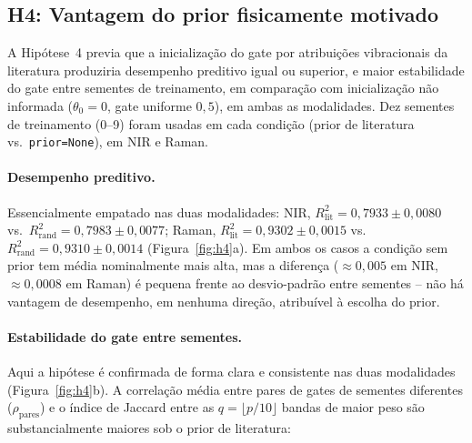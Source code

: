 %
%

\subsection{H4: Vantagem do prior fisicamente motivado}
\label{sec:results-h4}

A Hipótese~4 previa que a inicialização do gate por atribuições vibracionais da literatura produziria desempenho preditivo igual ou superior, e maior estabilidade do gate entre sementes de treinamento, em comparação com inicialização não informada ($\theta_0 = 0$, gate uniforme $0{,}5$), em ambas as modalidades. Dez sementes de treinamento (0--9) foram usadas em cada condição (prior de literatura vs.\ \texttt{prior=None}), em NIR e Raman.

\paragraph{Desempenho preditivo.} Essencialmente empatado nas duas modalidades: NIR, $R^2_{\text{lit}}=0{,}7933\pm0{,}0080$ vs.\ $R^2_{\text{rand}}=0{,}7983\pm0{,}0077$; Raman, $R^2_{\text{lit}}=0{,}9302\pm0{,}0015$ vs.\ $R^2_{\text{rand}}=0{,}9310\pm0{,}0014$ (Figura~\ref{fig:h4}a). Em ambos os casos a condição sem prior tem média nominalmente mais alta, mas a diferença ($\approx 0{,}005$ em NIR, $\approx 0{,}0008$ em Raman) é pequena frente ao desvio-padrão entre sementes -- não há vantagem de desempenho, em nenhuma direção, atribuível à escolha do prior.

\paragraph{Estabilidade do gate entre sementes.} Aqui a hipótese é confirmada de forma clara e consistente nas duas modalidades (Figura~\ref{fig:h4}b). A correlação média entre pares de gates de sementes diferentes ($\rho_{\text{pares}}$) e o índice de Jaccard entre as $q=\lfloor p/10 \rfloor$ bandas de maior peso são substancialmente maiores sob o prior de literatura:

